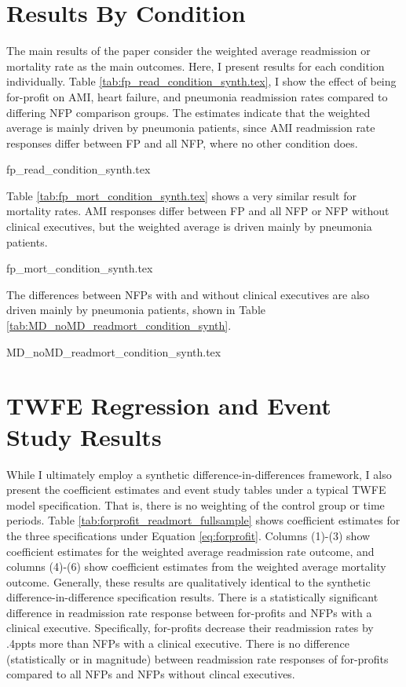 \documentclass[12pt]{article}
\begin{document}
\section{Results By Condition}\label{app:condition}

The main results of the paper consider the weighted average readmission or mortality rate as the main outcomes. Here, I present results for each condition individually. Table \ref{tab:fp_read_condition_synth.tex}, I show the effect of being for-profit on AMI, heart failure, and pneumonia readmission rates compared to differing NFP comparison groups. The estimates indicate that the weighted average is mainly driven by pneumonia patients, since AMI readmission rate responses differ between FP and all NFP, where no other condition does. 

{fp_read_condition_synth.tex}

Table \ref{tab:fp_mort_condition_synth.tex} shows a very similar result for mortality rates. AMI responses differ between FP and all NFP or NFP without clinical executives, but the weighted average is driven mainly by pneumonia patients. 

{fp_mort_condition_synth.tex}

The differences between NFPs with and without clinical executives are also driven mainly by pneumonia patients, shown in Table \ref{tab:MD_noMD_readmort_condition_synth}.

{MD_noMD_readmort_condition_synth.tex}

\section{TWFE Regression and Event Study Results}\label{app:fullsample}

While I ultimately employ a synthetic difference-in-differences framework, I also present the coefficient estimates and event study tables under a typical TWFE model specification. That is, there is no weighting of the control group or time periods. Table \ref{tab:forprofit_readmort_fullsample} shows coefficient estimates for the three specifications under Equation \ref{eq:forprofit}. Columns (1)-(3) show coefficient estimates for the weighted average readmission rate outcome, and columns (4)-(6) show coefficient estimates from the weighted average mortality outcome. Generally, these results are qualitatively identical to the synthetic difference-in-difference specification results. There is a statistically significant difference in readmission rate response between for-profits and NFPs with a clinical executive. Specifically, for-profits decrease their readmission rates by .4ppts more than NFPs with a clinical executive. There is no difference (statistically or in magnitude) between readmission rate responses of for-profits compared to all NFPs and NFPs without clincal executives. 
\end{document}
